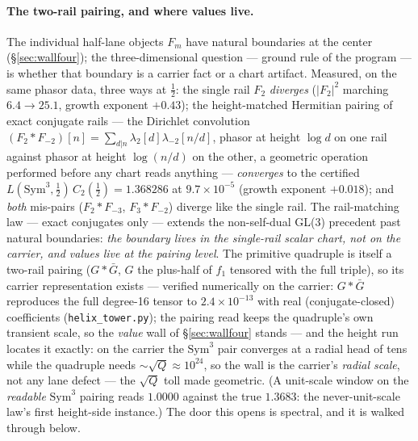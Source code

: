 \documentclass[11pt]{article}
\theoremstyle{definition}
\theoremstyle{remark}
\begin{document}
\paragraph{The two-rail pairing, and where values live.} The individual
half-lane objects $F_m$ have natural boundaries at the center
(\S\ref{sec:wallfour}); the three-dimensional question --- ground rule of the
program --- is whether that boundary is a carrier fact or a chart artifact.
Measured, on the same phasor data, three ways at $\tfrac12$: the single rail
$F_2$ \emph{diverges} ($|F_2|^2$ marching $6.4\to25.1$, growth exponent
$+0.43$); the height-matched Hermitian pairing of exact conjugate rails ---
the Dirichlet convolution $(F_2\ast F_{-2})[n]=\sum_{d|n}\lambda_2[d]
\lambda_{-2}[n/d]$, phasor at height $\log d$ on one rail against phasor at
height $\log(n/d)$ on the other, a geometric operation performed before any
chart reads anything --- \emph{converges} to the certified
$L(\mathrm{Sym}^3,\tfrac12)\,C_2(\tfrac12)=1.368286$ at $9.7\times10^{-5}$
(growth exponent $+0.018$); and \emph{both} mis-pairs ($F_2\ast F_{-3}$,
$F_3\ast F_{-2}$) diverge like the single rail. The rail-matching law ---
exact conjugates only --- extends the non-self-dual GL(3) precedent past
natural boundaries: \emph{the boundary lives in the single-rail scalar chart,
not on the carrier, and values live at the pairing level}. The primitive
quadruple is itself a two-rail pairing ($G\ast\bar G$, $G$ the plus-half of
$f_1$ tensored with the full triple), so its carrier representation exists
--- verified numerically on the carrier: $G\ast\bar G$ reproduces the full
degree-16 tensor to $2.4\times10^{-13}$ with real (conjugate-closed)
coefficients (\texttt{helix\_tower.py}); the pairing read keeps the
quadruple's own transient scale, so the
\emph{value} wall of \S\ref{sec:wallfour} stands --- and the height run
locates it exactly: on the carrier the $\mathrm{Sym}^3$ pair converges at a
radial head of tens while the quadruple needs $\sim\!\sqrt Q\approx10^{24}$,
so the wall is the carrier's \emph{radial scale}, not any lane defect ---
the $\sqrt Q$ toll made geometric. (A unit-scale window on the
\emph{readable} $\mathrm{Sym}^3$ pairing reads $1.0000$ against the true
$1.3683$: the never-unit-scale law's first height-side instance.) The door
this opens is spectral, and it is walked through below.
\end{document}

